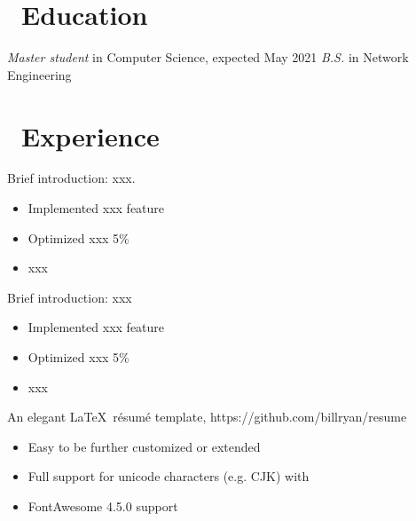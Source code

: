\documentclass{resume}
\begin{document}



\section{\faGraduationCap\ Education}
\textit{Master student} in Computer Science, expected May 2021
\textit{B.S.} in Network Engineering

\section{\faUsers\ Experience}
Brief introduction: xxx.
\begin{itemize}
  \item Implemented xxx feature
  \item Optimized xxx 5\%
  \item xxx
\end{itemize}

Brief introduction: xxx
\begin{itemize}
  \item Implemented xxx feature
  \item Optimized xxx 5\%
  \item xxx
\end{itemize}

An elegant \LaTeX\ résumé template, https://github.com/billryan/resume
\begin{itemize}
  \item Easy to be further customized or extended
  \item Full support for unicode characters (e.g. CJK) with \XeLaTeX\
  \item FontAwesome 4.5.0 support
\end{itemize}

\end{document}
